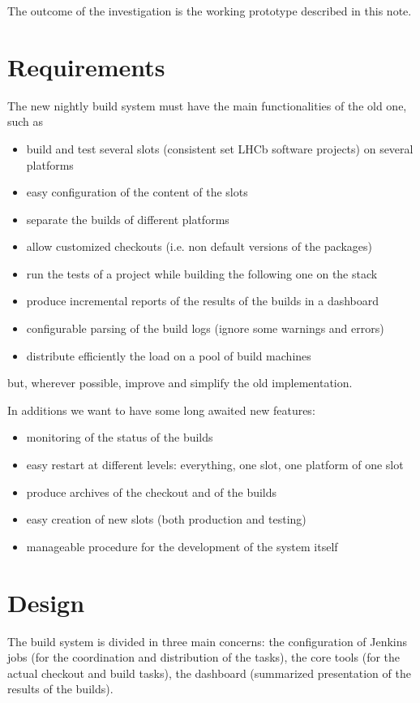 \documentclass{lhcbnote}
\begin{document}
The outcome of the investigation is the working prototype described in this
note.

\section{Requirements}
The new nightly build system must have the main functionalities of the old one,
such as
\begin{itemize}
  \item build and test several slots (consistent set LHCb software projects) on
several platforms
  \item easy configuration of the content of the slots
  \item separate the builds of different platforms
  \item allow customized checkouts (i.e. non default versions of the packages)
  \item run the tests of a project while building the following one on the stack
  \item produce incremental reports of the results of the builds in a dashboard
  \item configurable parsing of the build logs (ignore some warnings and errors)
  \item distribute efficiently the load on a pool of build machines
\end{itemize}
but, wherever possible, improve and simplify the old implementation.

In additions we want to have some long awaited new features:
\begin{itemize}
  \item monitoring of the status of the builds
  \item easy restart at different levels: everything, one slot, one platform of
one slot
  \item produce archives of the checkout and of the builds
  \item easy creation of new slots (both production and testing)
  \item manageable procedure for the development of the system itself
\end{itemize}

\section{Design}
The build system is divided in three main concerns: the configuration of Jenkins
jobs (for the coordination and distribution of the tasks), the core tools
(for the actual checkout and build tasks), the dashboard (summarized
presentation of the results of the builds).
\end{document}

